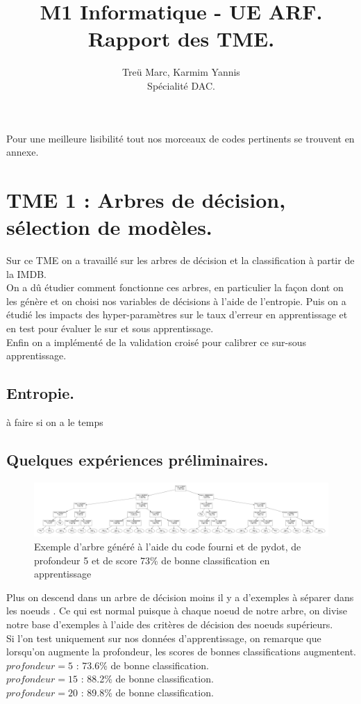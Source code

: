 \documentclass{article}
\title{M1 Informatique - UE ARF.\\Rapport des TME.}
\author{Treü Marc, Karmim Yannis\\Spécialité DAC.}
\begin{document}
\maketitle
\clearpage
\tableofcontents
\clearpage
Pour une meilleure lisibilité tout nos morceaux de codes pertinents se trouvent en annexe. 
\section{TME 1 : Arbres de décision, sélection de modèles.}
Sur ce TME on a travaillé sur les arbres de décision et la classification à partir de la IMDB.\\
On a dû étudier comment fonctionne ces arbres, en particulier la façon dont on les génère et on choisi nos variables de décisions à l'aide de l'entropie. Puis on a étudié les impacts des hyper-paramètres sur le taux d'erreur en apprentissage et en test pour évaluer le sur et sous apprentissage. \\
Enfin on a implémenté de la validation croisé pour calibrer ce sur-sous apprentissage.\\
\subsection{Entropie.}
à faire si on a le temps
\subsection{Quelques expériences préliminaires.}

\begin{figure}[h]
	\center
	\includegraphics[width=16cm]{../tme1/test_tree.png} 
	 \caption{Exemple d'arbre généré à l'aide du code fourni et de pydot, de profondeur 5 et de score 73\% de bonne classification en apprentissage }
	 
\end{figure}
Plus on descend dans un arbre de décision moins il y a d'exemples à séparer dans les noeuds . Ce qui est normal puisque à chaque noeud de notre arbre, on divise notre base d'exemples à l'aide des critères de décision des noeuds supérieurs.\\
Si l'on test uniquement sur nos données d'apprentissage, on remarque que lorsqu'on augmente la profondeur, les scores de bonnes classifications augmentent.\\
$profondeur = 5$ : 73.6\% de bonne classification.\\
$profondeur = 15$ : 88.2\% de bonne classification.\\
$profondeur = 20$ : 89.8\% de bonne classification.\\
\end{document}
